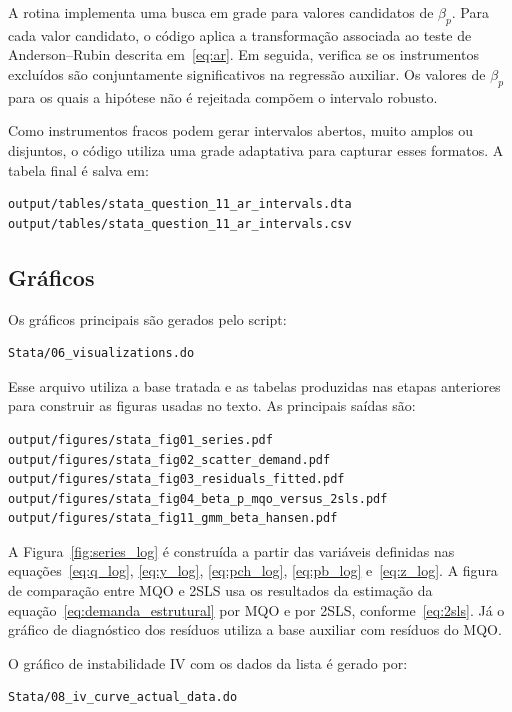 \documentclass[12pt,a4paper]{article}
\begin{document}
A rotina implementa uma busca em grade para valores candidatos de \(\beta_p\). Para cada valor candidato, o código aplica a transformação associada ao teste de Anderson--Rubin descrita em~\eqref{eq:ar}. Em seguida, verifica se os instrumentos excluídos são conjuntamente significativos na regressão auxiliar. Os valores de \(\beta_p\) para os quais a hipótese não é rejeitada compõem o intervalo robusto.

Como instrumentos fracos podem gerar intervalos abertos, muito amplos ou disjuntos, o código utiliza uma grade adaptativa para capturar esses formatos. A tabela final é salva em:

\begin{verbatim}
output/tables/stata_question_11_ar_intervals.dta
output/tables/stata_question_11_ar_intervals.csv
\end{verbatim}

\subsection*{Gráficos}

Os gráficos principais são gerados pelo script:

\begin{verbatim}
Stata/06_visualizations.do
\end{verbatim}

Esse arquivo utiliza a base tratada e as tabelas produzidas nas etapas anteriores para construir as figuras usadas no texto. As principais saídas são:

\begin{verbatim}
output/figures/stata_fig01_series.pdf
output/figures/stata_fig02_scatter_demand.pdf
output/figures/stata_fig03_residuals_fitted.pdf
output/figures/stata_fig04_beta_p_mqo_versus_2sls.pdf
output/figures/stata_fig11_gmm_beta_hansen.pdf
\end{verbatim}

A Figura~\ref{fig:series_log} é construída a partir das variáveis definidas nas equações~\eqref{eq:q_log}, \eqref{eq:y_log}, \eqref{eq:pch_log}, \eqref{eq:pb_log} e~\eqref{eq:z_log}. A figura de comparação entre MQO e 2SLS usa os resultados da estimação da equação~\eqref{eq:demanda_estrutural} por MQO e por 2SLS, conforme~\eqref{eq:2sls}. Já o gráfico de diagnóstico dos resíduos utiliza a base auxiliar com resíduos do MQO.

O gráfico de instabilidade IV com os dados da lista é gerado por:

\begin{verbatim}
Stata/08_iv_curve_actual_data.do
\end{verbatim}
\end{document}
